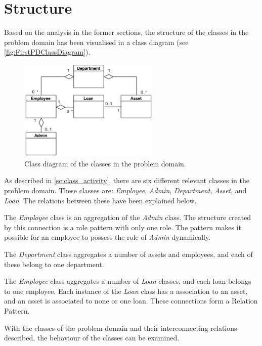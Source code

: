 \section{Structure}\label{sc:structure}
Based on the analysis in the former sections, the structure of the classes in the problem domain has been visualised in a class diagram (see \autoref{fig:FirstPDClassDiagram}).

\begin{figure}[H]
    \centering
    \includegraphics[width=0.6\textwidth]{figures/ClassDiagrams/InitialClassDiagramWithoutTag.png}
    \caption{Class diagram of the classes in the problem domain.}
    \label{fig:FirstPDClassDiagram}
\end{figure}

As described in \autoref{sc:class_activity}, there are six different relevant classes in the problem domain. These classes are: \textit{Employee}, \textit{Admin}, \textit{Department}, \textit{Asset}, and \textit{Loan}. The relations between these have been explained below.
\par

The \textit{Employee} class is an aggregation of the \textit{Admin} class. The structure created by this connection is a role pattern with only one role. The pattern makes it possible for an employee to possess the role of \textit{Admin} dynamically.
\par

The \textit{Department} class aggregates a number of assets and employees, and each of these belong to one department.
\par

The \textit{Employee} class aggregates a number of \textit{Loan} classes, and each loan belongs to one employee. Each instance of the \textit{Loan} class has a association to an asset, and an asset is associated to none or one loan. These connections form a Relation Pattern.

\par

With the classes of the problem domain and their interconnecting relations described, the behaviour of the classes can be examined.
\newpage